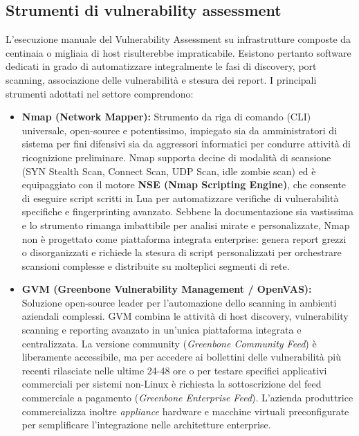 \documentclass[../../main.tex]{subfiles}
\begin{document}
\subsection{Strumenti di vulnerability assessment}
\label{subsec:va_tools}

L'esecuzione manuale del Vulnerability Assessment su infrastrutture composte da centinaia o migliaia di host risulterebbe impraticabile. Esistono pertanto software dedicati in grado di automatizzare integralmente le fasi di discovery, port scanning, associazione delle vulnerabilità e stesura dei report. I principali strumenti adottati nel settore comprendono:

\begin{itemize}
    \item \textbf{Nmap (Network Mapper):} Strumento da riga di comando (CLI) universale, open-source e potentissimo, impiegato sia da amministratori di sistema per fini difensivi sia da aggressori informatici per condurre attività di ricognizione preliminare. Nmap supporta decine di modalità di scansione (SYN Stealth Scan, Connect Scan, UDP Scan, idle zombie scan) ed è equipaggiato con il motore \textbf{NSE (Nmap Scripting Engine)}, che consente di eseguire script scritti in Lua per automatizzare verifiche di vulnerabilità specifiche e fingerprinting avanzato. Sebbene la documentazione sia vastissima e lo strumento rimanga imbattibile per analisi mirate e personalizzate, Nmap non è progettato come piattaforma integrata enterprise: genera report grezzi o disorganizzati e richiede la stesura di script personalizzati per orchestrare scansioni complesse e distribuite su molteplici segmenti di rete.
    
    \item \textbf{GVM (Greenbone Vulnerability Management / OpenVAS):} Soluzione open-source leader per l'automazione dello scanning in ambienti aziendali complessi. GVM combina le attività di host discovery, vulnerability scanning e reporting avanzato in un'unica piattaforma integrata e centralizzata. La versione community (\textit{Greenbone Community Feed}) è liberamente accessibile, ma per accedere ai bollettini delle vulnerabilità più recenti rilasciate nelle ultime 24-48 ore o per testare specifici applicativi commerciali per sistemi non-Linux è richiesta la sottoscrizione del feed commerciale a pagamento (\textit{Greenbone Enterprise Feed}). L'azienda produttrice commercializza inoltre \textit{appliance} hardware e macchine virtuali preconfigurate per semplificare l'integrazione nelle architetture enterprise.
    

\end{itemize}
\end{document}
